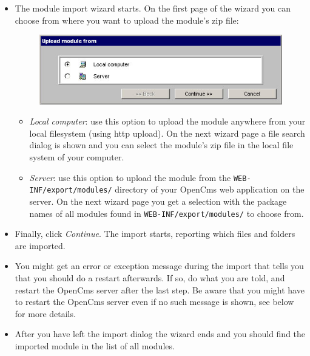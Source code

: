 \begin{itemize}
\item The module import wizard starts. On the first page of the wizard you can choose from where you want 
to upload the module's zip file:
\begin{figure}[hbt]
\begin{center}
\includegraphics[width=\sgw]{pics/modules/import3}
\end{center}
\end{figure}

\begin{itemize}

\item {\em Local computer}: use this option to upload the module anywhere from your local filesystem 
(using http upload). On the next wizard page a file search dialog is shown and you can select the 
module's zip file in the local file system of your computer. 

\item {\em Server}: use this option to upload the module from the {\tt WEB-INF/export/modules/} directory of 
your OpenCms web application on the server.
On the next wizard page you get a selection with the package names of all modules found in 
{\tt WEB-INF/export/modules/} to choose from. 

\end{itemize}

\item Finally, click {\em Continue}. The import starts, reporting which files and folders are imported.

\item You might get an error or exception message during the import that tells you that you should do a 
restart afterwards. If so, do what you are told, and restart the OpenCms server after the last step. Be 
aware that you might have to restart the OpenCms server even if no such message is shown, see below for 
more details.

\item After you have left the import dialog the wizard ends and you should find the imported module in 
the list of all modules. 

\end{itemize}

